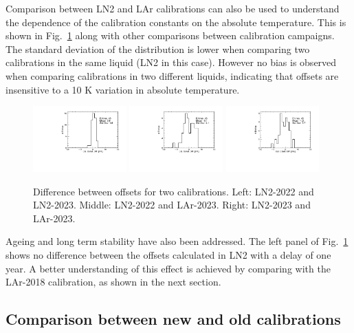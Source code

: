 Comparison between LN2 and LAr calibrations can also be used to understand the dependence of the calibration constants on the absolute temperature. This is shown in Fig.~\ref{fig:comp_newCalib} along with other comparisons between calibration campaigns. The standard deviation of the distribution is lower when comparing two calibrations in the same liquid (LN2 in this case). However no bias is observed when comparing calibrations in two different liquids, indicating that offsets are insensitive to a 10 K variation in absolute temperature.

\begin{figure}[htbp]
\centering
{\includegraphics[width=0.32\textwidth]{images/figure_21_a.pdf}}
{\includegraphics[width=0.32\textwidth]{images/figure_21_b.pdf}}
{\includegraphics[width=0.32\textwidth]{images/figure_21_c.pdf}}
\caption{Difference between offsets for two calibrations. Left: LN2-2022 and LN2-2023. Middle: LN2-2022 and LAr-2023. Right:  LN2-2023 and LAr-2023.}
\label{fig:comp_newCalib}
\end{figure}

Ageing and long term stability have also been addressed. The left panel of Fig.~\ref{fig:comp_newCalib} shows no difference between the offsets calculated in LN2 with a delay of one year. A better understanding of this effect is achieved by comparing with the LAr-2018 calibration, as shown in the next section.

\subsection{Comparison between new and old calibrations}
\label{sec:compNewOld}

